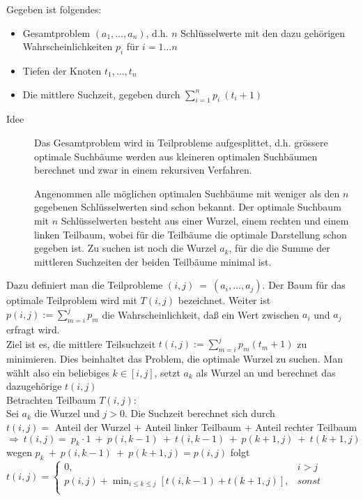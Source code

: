 \documentclass[ngerman,draft,parskip=half*,twoside]{scrreprt}
\theoremstyle{break}
\begin{document}
Gegeben ist folgendes:
\begin{itemize}
    \item Gesamtproblem $(a_1, \dots,a_n)$, d.h. $n$ Schlüsselwerte mit den dazu gehörigen Wahrscheinlichkeiten $p_i$ für $i=1 \dots n$
    \item Tiefen der Knoten $t_1,\dots,t_n$
    \item Die mittlere Suchzeit, gegeben durch $\sum_{i=1}^n p_i\:(t_i+1)$
\end{itemize}
\begin{description}
    \item[Idee] Das Gesamtproblem wird in Teilprobleme aufgesplittet, d.h. grössere optimale Suchbäume werden
     aus kleineren optimalen Suchbäumen  berechnet und zwar in einem rekursiven Verfahren.
     
     Angenommen alle möglichen optimalen Suchbäume mit weniger als den $n$ gegebenen Schlüsselwerten sind schon bekannt.
     Der optimale Suchbaum mit $n$ Schlüsselwerten besteht aus einer Wurzel, einem rechten und einem linken Teilbaum, wobei
     für die Teilbäume die optimale Darstellung schon gegeben ist. Zu suchen ist noch die Wurzel $a_k$, für die die
     Summe der mittleren Suchzeiten der beiden Teilbäume minimal ist.
\end{description}
Dazu definiert man die Teilprobleme $(i,j)\:=\:(a_i,\dots,a_j)$. Der Baum für das optimale Teilproblem wird mit $T(i,j)$
bezeichnet. Weiter ist $p(i,j):=\sum_{m=i}^j p_m$ die Wahrscheinlichkeit, daß ein Wert zwischen $a_i$ und $a_j$
erfragt wird.\\ Ziel ist es, die mittlere Teilsuchzeit $t(i,j):=\sum_{m=i}^j p_m(t_m+1)$ zu minimieren. Dies beinhaltet
das Problem, die optimale Wurzel zu suchen. Man wählt also ein beliebiges $k\in [i,j]$, setzt $a_k$ als Wurzel
an und berechnet das dazugehörige $t(i,j)$ \\
Betrachten Teilbaum $T(i,j)$:\\ Sei $a_k$ die Wurzel und $j>0$. Die Suchzeit berechnet sich durch\\
$t(i,j)=$ Anteil der Wurzel + Anteil linker Teilbaum + Anteil rechter Teilbaum
$\Rightarrow\:t(i,j)=\:p_k\cdot 1\:+\:p(i,k-1)\:+\:t(i,k-1)\:+\:p(k+1,j)\:+\:t(k+1,j)$
wegen $p_k\:+\:p(i,k-1)\:+\:p(k+1,j)=p(i,j)$ folgt
$t(i,j)=\left\{\begin{array}{ll}
    0, & i>j \\
    p(i,j)+ \min_{i\leq k\leq j}[t(i,k-1)+t(k+1,j)], & sonst \\ \end{array}\right.    $
\end{document}
